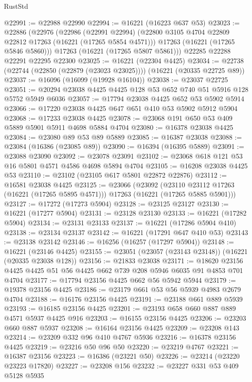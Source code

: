 \begin{lexlean}{RustStd}
\begin{coremodule}
@22991 := @22988 @22990
@22994 := @16221 (@16223 @637 @53)
@23023 := @22886
    (@22976
      (@22986
        (@22991 @22994)
        (@22800 @3105 @4704 @22809 @22812 @17263 (@16221 (@17265 @5854 @4571)))
        @17263
        (@16221 (@17265 @5846 @5860)))
      @17263
      (@16221 (@17265 @5807 @5861)))
    @22285
    @22288
    @22291
    @22295
    @22300
@23025 := @16221 (@22304 @4425)
@23034 := @22738 (@22744 (@22850 (@22879 (@23023 @23025)))) (@16221 (@20335 @22725 @89))
@23037 := @16096 (@16099 (@19928 @16104))
@23038 := @23037 @22725
@23051 := @20294 @23038 @4425 @4425 @128 @53 @652 @740 @51 @5916 @128 @5752 @5949 @6036
@23057 := @17794 @23038 @4425 @652 @53 @5902 @5914
@23066 := @17220 @23038 @4425 @647 @651 @410 @53 @5902 @5912 @5904
@23068 := @17233 @23038 @4425
@23078 := @23068 @191 @650 @53 @409 @5889 @5901 @5911 @4698 @5884 @4704
@23080 := @16378 @23038 @4425
@23084 := @23080 @89 @53 @89 @5889
@23085 := @16387 @23038
@23088 := @23084 (@16386 (@23085 @89))
@23090 := @16394 (@16395 @5889)
@23091 := @23088 @23090
@23092 := @23078 @23091
@23102 := @23068 @618 @121 @53 @16 @5801 @4571 @4586 @4698 @5894 @4704
@23105 := @16208 @23038 @4425 @53
@23110 := @23102 (@23105 @617 @5801 @22872 @22876)
@23112 := @16581 @23038 @4425
@23125 := @23066
    (@23092
      (@23110 @23112 @17263 (@16221 (@17265 @5895 @4571)))
      @17263
      (@16221 (@17265 @5885 @5901)))
@23127 := @17272 (@17273 @5904)
@23128 := @23125 @23127
@23130 := @16221 (@17277 @5904)
@23131 := @23128 @23130
@23133 := @16221 (@17282 @5904)
@23134 := @23131 @23133
@23137 := @16221 (@17286 @5904 @410)
@23138 := @23134 @23137
@23142 := @16221 (@17291 @647 @410 @53)
@23143 := @23138 @23142
@23146 := @16256 (@16257 (@17297 @5904))
@23148 := @16221 (@23146 @4425)
@23155 := @23051 (@23057 (@23143 @23148)) (@16221 (@20335 @23038 @128))
@23156 := @21833 @23038
@23171 := @18620 @23156 @4425 @4425 @51 @56 @4425 @662 @739 @208 @5946 @6035 @91 @4853 @701 @4704
@23177 := @17794 @23156 @4425 @662 @56 @5942 @5944
@23179 := @19378 @23156 @4425
@23186 := @23179 @661 @53 @56 @5939 @4983 @2679 @4704
@23188 := @16176 @23156 @4425
@23191 := @23188 @661 @889 @5939
@23193 := @16185 @23156 @4425
@23201 := @23193 @658 @660 @887 @889 @4571 @5937 @4425 @916
@23203 := @16155 @23156 @4425
@23206 := @23203 @660 @887 @5937
@23208 := @16164 @23156 @4425
@23209 := @23208 @143
@23214 := @23209 @332 @96 @410 @4767 @5936
@23216 := @16378 @23156 @4425
@23219 := @23216 @50 @96 @50
@23220 := @23219 @4767
@23221 := @16387 @23156
@23223 := @16386 (@23221 @50)
@23226 := @23214 (@23220 @23223 @17820)
@23227 := @23208 @156
@23232 := @23227 @331 @53 @409 @5128 @5935

\end{coremodule}
\end{lexlean}
